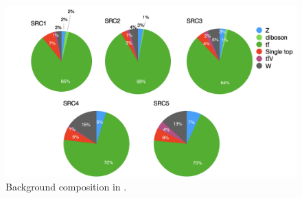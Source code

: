 				\begin{figure}[t]
				  \begin{center}
				   \includegraphics[width=\textwidth]{figures/stop/piechart_SRCcomp}
				   \caption{Background composition in \SRC.}
				   \label{fig:SRC_bkgcomp}
				  \end{center}
				\end{figure}

